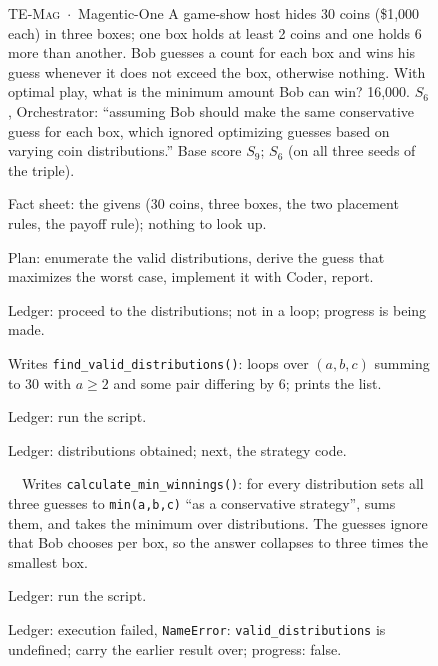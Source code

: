 \begin{figure}[ht]
\centering
\begin{minipage}{\textwidth}
\begin{qbox}{\textsc{TE-Mag} \,$\cdot$\, Magentic-One}
\fontsize{7.4}{8.6}\selectfont
{} A game-show host hides 30 coins (\$1,000 each) in three boxes; one box
holds at least 2 coins and one holds 6 more than another. Bob guesses a count for
each box and wins his guess whenever it does not exceed the box, otherwise nothing.
With optimal play, what is the minimum amount Bob can win?
 16,000.
 $S_6$, Orchestrator: ``assuming Bob should make the same conservative
guess for each box, which ignored optimizing guesses based on varying coin
distributions.''
 Base score $S_9$; \soap{} $S_6$ (on all three seeds of the triple).
\medskip

Fact sheet: the givens (30 coins, three boxes, the two placement rules, the payoff
rule); nothing to look up.

Plan: enumerate the valid distributions, derive the guess that maximizes the worst
case, implement it with Coder, report.

Ledger: proceed to the distributions; not in a loop; progress is being made.

Writes \texttt{find\_valid\_distributions()}: loops over $(a,b,c)$ summing to 30
with $a\ge2$ and some pair differing by 6; prints the list.

Ledger: run the script.

Ledger: distributions obtained; next, the strategy code.

\qgold\ \qsoap\
Writes \texttt{calculate\_min\_winnings()}: for every distribution sets all three
guesses to \texttt{min(a,b,c)} ``as a conservative strategy'', sums them, and takes
the minimum over distributions. The guesses ignore that Bob chooses per box, so the
answer collapses to three times the smallest box.

Ledger: run the script.

Ledger: execution failed, \texttt{NameError}: \texttt{valid\_distributions} is
undefined; carry the earlier result over; progress: false.


\end{qbox}
\end{minipage}
\end{figure}
